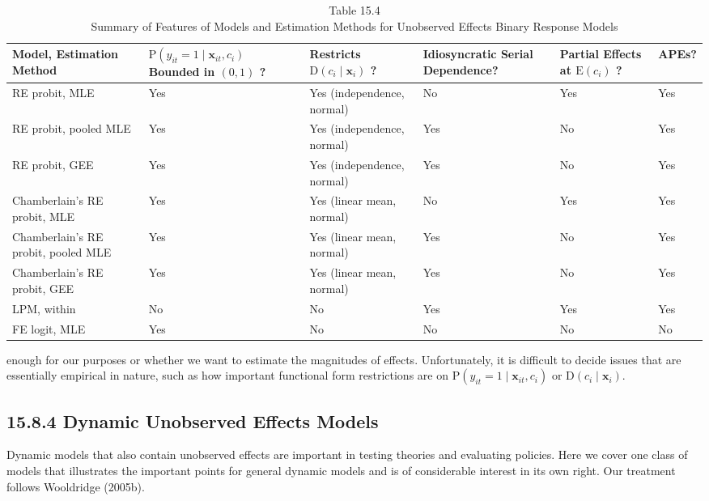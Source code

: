 \documentclass[10pt]{article}
\begin{document}
\begin{table}[h]
\begin{center}
\captionsetup{labelformat=empty}
\caption{Table 15.4\\
Summary of Features of Models and Estimation Methods for Unobserved Effects Binary Response Models}
\begin{tabular}{|l|l|l|l|l|l|}
\hline
Model, Estimation Method & $\mathrm{P}\left(y_{i t}=\right. \left.1 \mid \mathbf{x}_{i t}, c_{i}\right)$ Bounded in $(0,1)$ ? & Restricts $\mathrm{D}\left(c_{i} \mid \mathbf{x}_{i}\right)$ ? & Idiosyncratic Serial Dependence? & Partial Effects at $\mathrm{E}\left(c_{i}\right)$ ? & APEs? \\
\hline
RE probit, MLE & Yes & Yes (independence, normal) & No & Yes & Yes \\
\hline
RE probit, pooled MLE & Yes & Yes (independence, normal) & Yes & No & Yes \\
\hline
RE probit, GEE & Yes & Yes (independence, normal) & Yes & No & Yes \\
\hline
Chamberlain's RE probit, MLE & Yes & Yes (linear mean, normal) & No & Yes & Yes \\
\hline
Chamberlain's RE probit, pooled MLE & Yes & Yes (linear mean, normal) & Yes & No & Yes \\
\hline
Chamberlain's RE probit, GEE & Yes & Yes (linear mean, normal) & Yes & No & Yes \\
\hline
LPM, within & No & No & Yes & Yes & Yes \\
\hline
FE logit, MLE & Yes & No & No & No & No \\
\hline
\end{tabular}
\end{center}
\end{table}

enough for our purposes or whether we want to estimate the magnitudes of effects. Unfortunately, it is difficult to decide issues that are essentially empirical in nature, such as how important functional form restrictions are on $\mathrm{P}\left(y_{i t}=1 \mid \mathbf{x}_{i t}, c_{i}\right)$ or $\mathrm{D}\left(c_{i} \mid \mathbf{x}_{i}\right)$.

\subsection*{15.8.4 Dynamic Unobserved Effects Models}
Dynamic models that also contain unobserved effects are important in testing theories and evaluating policies. Here we cover one class of models that illustrates the important points for general dynamic models and is of considerable interest in its own right. Our treatment follows Wooldridge (2005b).
\end{document}
